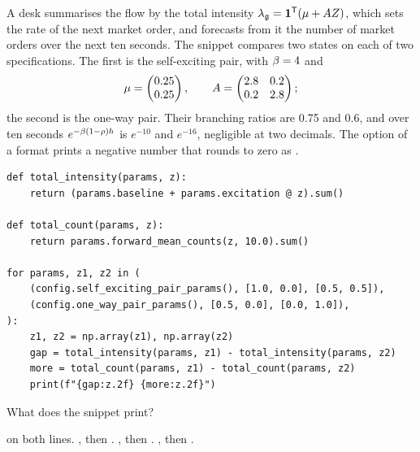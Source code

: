 \begin{question}
\label{question.totalIntensityIsNotTheState}
A desk summarises the flow by the total intensity
$\lambda_{\mathfrak{g}} = \mathbf{1}^{\mathsf{T}}(\mu + AZ)$,
which sets the rate of the next market order,
and forecasts from it the number of market orders over the next ten seconds.
The snippet compares two states on each of two specifications.
The first is the self-exciting pair, with $\beta = 4$ and
\begin{equation*}
 \mu = \begin{pmatrix} 0.25 \\ 0.25 \end{pmatrix},
 \qquad
 A = \begin{pmatrix} 2.8 & 0.2 \\ 0.2 & 2.8 \end{pmatrix};
\end{equation*}
the second is the one-way pair.
Their branching ratios are 0.75 and 0.6,
and over ten seconds $e^{-\beta(1 - \rho)h}$ is $e^{-10}$ and $e^{-16}$,
negligible at two decimals.
The option  of a format prints a negative number that rounds to zero as .
\begin{lstlisting}[caption={Two states of equal total intensity}, label=listing.totalIntensityIsNotTheState]
def total_intensity(params, z):
    return (params.baseline + params.excitation @ z).sum()

def total_count(params, z):
    return params.forward_mean_counts(z, 10.0).sum()

for params, z1, z2 in (
    (config.self_exciting_pair_params(), [1.0, 0.0], [0.5, 0.5]),
    (config.one_way_pair_params(), [0.5, 0.0], [0.0, 1.0]),
):
    z1, z2 = np.array(z1), np.array(z2)
    gap = total_intensity(params, z1) - total_intensity(params, z2)
    more = total_count(params, z1) - total_count(params, z2)
    print(f"{gap:z.2f} {more:z.2f}")
\end{lstlisting}
What does the snippet print?
\begin{choices}
 \choice {} on both lines.
 \correctchoice {}, then .
 \choice {}, then .
 \choice {}, then .
\end{choices}
\end{question}

